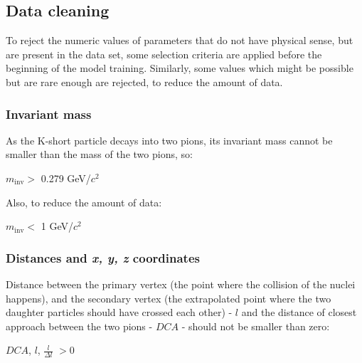 \subsection{Data cleaning}
To reject the numeric values of parameters that do not have physical sense, but are present in the data set, some selection criteria are applied before the beginning of the model training. Similarly, some values which might be possible but are rare enough are rejected, to reduce the amount of data.

\subsubsection{Invariant mass}
As the K-short particle decays into two pions, its invariant mass cannot be smaller than the mass of the two pions, so:
\begin{center}
    $m_\text{inv} >$ 0.279 GeV/$c^2$
\end{center}
Also, to reduce the amount of data:
\begin{center}
   $m_\text{inv} <$ 1 GeV/$c^2$
\end{center}

\subsubsection{Distances and \emph{x, y, z} coordinates}
Distance between the primary vertex (the point where the collision of the nuclei happens), and the secondary vertex (the extrapolated point where the two daughter particles should have crossed each other)  - $l$ and the distance of closest approach between the two pions - $DCA$ - should not be smaller than zero:
\begin{center}
    $DCA$, $l$, $\frac{l}{\Delta l}$ $> 0$
\end{center}

